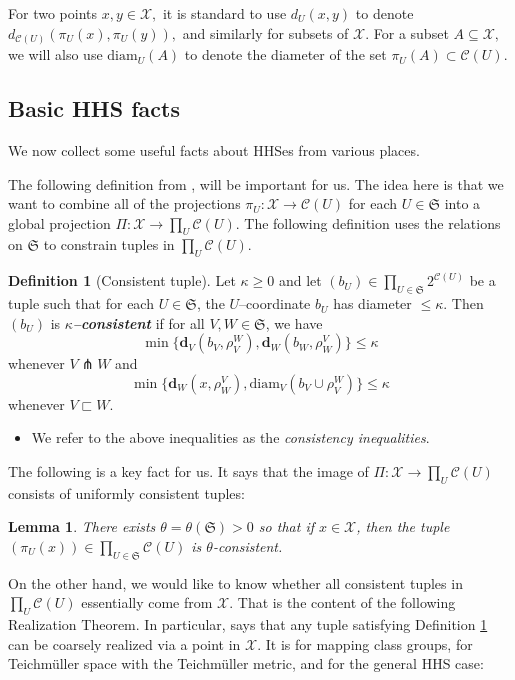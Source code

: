 \documentclass{amsart}
\newtheorem{lemma}[theorem]{Lemma}
\theoremstyle{definition}
\newtheorem{definition}[theorem]{Definition}
\theoremstyle{remark}
\theoremstyle{definition}
\newcommand{\calC}{\mathcal{C}}
\newcommand{\calX}{\mathcal{X}}
\newcommand{\dist}{\mathbf{d}}
\newcommand{\diam}{\mathrm{diam}}
\newcommand{\nest}{\sqsubset}
\begin{document}
For two points $x,y \in \calX,$ it is standard to use $d_U(x,y)$ to denote $d_{\calC(U)}(\pi_U(x), \pi_U(y)),$ and similarly for subsets of $\calX.$ For a subset $A \subseteq \calX,$ we will also use $\diam_U(A)$ to denote the diameter of the set $\pi_U(A) \subset \calC(U)$.

\subsection{Basic HHS facts}

We now collect some useful facts about HHSes from various places. \medskip

The following definition from \cite{Beh:thesis, BKMM:qirigid, HHS_II}, will be important for us.  The idea here is that we want to combine all of the projections $\pi_U:\calX \to \calC(U)$ for each $U \in \mathfrak S$ into a global projection $\Pi:\calX \to \prod_U \calC(U)$.  The following definition uses the relations on $\mathfrak S$ to constrain tuples in $\prod_U \calC(U)$.

\begin{definition}[Consistent tuple]\label{defn:consistency}
Let $\kappa\geq 0$ and let $(b_U)\in\prod_{U\in\mathfrak S}2^{\calC(U)}$ be a tuple such that for each $U\in\mathfrak S$, 
the $U$--coordinate  $b_U$ has diameter $\leq\kappa$.  Then $(b_U)$ is \textbf{\em $\kappa$--consistent} if for all 
$V,W\in \mathfrak S$, we have $$\min\{\dist_V(b_V,\rho^W_V),\dist_W(b_W,\rho^V_W)\}\leq\kappa$$ whenever $V\pitchfork W$ and 
$$\min\{\dist_W(x,\rho^V_W),\diam_V(b_V\cup\rho^W_V)\}\leq\kappa$$ whenever $V\nest W$.
\begin{itemize}
\item We refer to the above inequalities as the \emph{consistency inequalities}.
\end{itemize}
\end{definition}




\medskip


The following is a key fact for us.  It says that the image of $\Pi:\calX \to \prod_U \calC(U)$ consists of uniformly consistent tuples:

\begin{lemma}\label{lem:base consistency}
There exists $\theta = \theta(\mathfrak S)>0$ so that if $x \in \calX$, then the tuple $(\pi_U(x)) \in \prod_{U \in \mathfrak S} \calC(U)$ is $\theta$-consistent.
\end{lemma}


On the other hand, we would like to know whether all consistent tuples in $\prod_U \calC(U)$ essentially come from $\calX$.  That is the content of the following Realization Theorem.  In particular, says that any tuple satisfying Definition \ref{defn:consistency} can be coarsely realized via a point in $\calX$.  It is \cite[Theorem 4.3]{BKMM:qirigid} for mapping class groups, \cite[Theorem 3.2]{EMR:rank} for Teichm\"uller space with the Teichm\"uller metric, and \cite[Theorem 3.1]{HHS_II} for the general HHS case:
\end{document}
